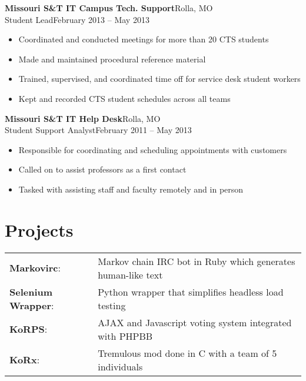\documentclass[margin]{res}
\newcommand{\github}[0]%
{%
  \hspace{-4mm}\faGithubSign\hspace{1mm}%
}
\begin{document}
\begin{resume}
       \textbf{Missouri S\&T IT Campus Tech. Support}\hfill  Rolla, MO\\
       Student Lead\hfill February 2013 -- May 2013
       \begin{itemize} \itemsep -1pt  %
         \item Coordinated and conducted meetings for more than 20 CTS students
         \item Made and maintained procedural reference material
         \item Trained, supervised, and coordinated time off for service desk student workers
         \item Kept and recorded CTS student schedules across all teams
       \end{itemize}
     
       \textbf{Missouri S\&T IT Help Desk}\hfill Rolla, MO\\
       Student Support Analyst\hfill February 2011 -- May 2013
       \begin{itemize} \itemsep -1pt  %
         \item Responsible for coordinating and scheduling appointments with customers
         \item Called on to assist professors as a first contact
         \item Tasked with assisting staff and faculty remotely and in person
       \end{itemize}

    \section{Projects} 
      \begin{tabular}{l p{4in}}
        \github\textbf{Markovirc}:            & Markov chain IRC bot in Ruby which generates human-like text \\ [1pt]
        \github\textbf{Selenium Wrapper}:     & Python wrapper that simplifies headless load testing \\ [1pt]
        \textbf{KoRPS}:                       & AJAX and Javascript voting system integrated with PHPBB \\ [1pt]
        \textbf{KoRx}:                        & Tremulous mod done in C with a team of 5 individuals \\ [1pt]
      \end{tabular}


\end{resume}
\end{document}
